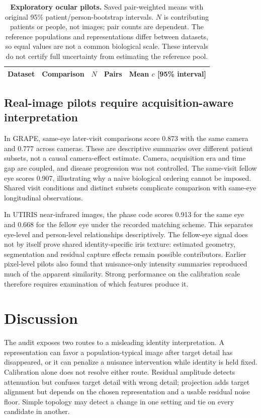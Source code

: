 \documentclass[10pt,twocolumn,letterpaper]{article}
\begin{document}
\begin{table}[t]
\centering
\caption{\textbf{Exploratory ocular pilots.} Saved pair-weighted means with original 95\% patient/person-bootstrap intervals. $N$ is contributing patients or people, not images; pair counts are dependent. The reference populations and representations differ between datasets, so equal values are not a common biological scale. These intervals do not certify full uncertainty from estimating the reference pool.}
\label{tab:ocular}
\small
\begin{tabular}{@{}llrrl@{}}
\toprule
Dataset & Comparison & $N$ & Pairs & Mean $c$ [95\% interval] \\
\midrule

\end{tabular}
\end{table}

\subsection{Real-image pilots require acquisition-aware interpretation}
In GRAPE, same-eye later-visit comparisons score 0.873 with the same camera and 0.777 across cameras. These are descriptive summaries over different patient subsets, not a causal camera-effect estimate. Camera, acquisition era and time gap are coupled, and disease progression was not controlled. The same-visit fellow eye scores 0.907, illustrating why a naive biological ordering cannot be imposed. Shared visit conditions and distinct subsets complicate comparison with same-eye longitudinal observations.

In UTIRIS near-infrared images, the phase code scores 0.913 for the same eye and 0.668 for the fellow eye under the recorded matching scheme. This separates eye-level and person-level relationships descriptively. The fellow-eye signal does not by itself prove shared identity-specific iris texture: estimated geometry, segmentation and residual capture effects remain possible contributors. Earlier pixel-level pilots also found that nuisance-only intensity summaries reproduced much of the apparent similarity. Strong performance on the calibration scale therefore requires examination of which features produce it.

\section{Discussion}
The audit exposes two routes to a misleading identity interpretation. A representation can favor a population-typical image after target detail has disappeared, or it can penalize a nuisance intervention while identity is held fixed. Calibration alone does not resolve either route. Residual amplitude detects attenuation but confuses target detail with wrong detail; projection adds target alignment but depends on the chosen representation and a usable residual noise floor. Simple topology may detect a change in one setting and tie on every candidate in another.
\end{document}
